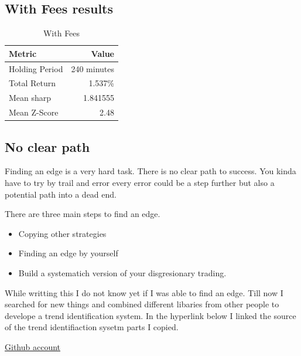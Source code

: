 \documentclass[12pt]{article}
\begin{document}
\subsection{With Fees results}


\begin{table}[H]
  \centering
  \caption{With Fees}
  \label{tab:backtest_results_fees}
  \begin{tabular}{@{}lr@{}}
    \toprule
    Metric & Value \\
    \midrule
    Holding Period & 240 minutes \\
    Total Return & 1.537\% \\
    Mean sharp & 1.841555 \\
    Mean Z-Score & 2.48 \\

    \bottomrule
  \end{tabular}
\end{table}








\subsection{No clear path}
Finding an edge is a very hard task. There is no clear path to success. You kinda have to try by trail and error every error could be a step further but also a potential path into a dead end.
  



There are three main steps to find an edge. 
\begin{itemize}
  \item Copying other strategies
  \item Finding an edge by yourself
  \item Build a systematich version of your disgresionary trading.
\end{itemize}


While writting this I do not know yet if I was able to find an edge. Till now I searched for new things and combined different libaries from other people to develope a trend identification system. In the hyperlink below I linked the source of the trend identifiaction sysetm parts I copied.

\href{https://github.com/neurotrader888}{Github account} 
\end{document}
